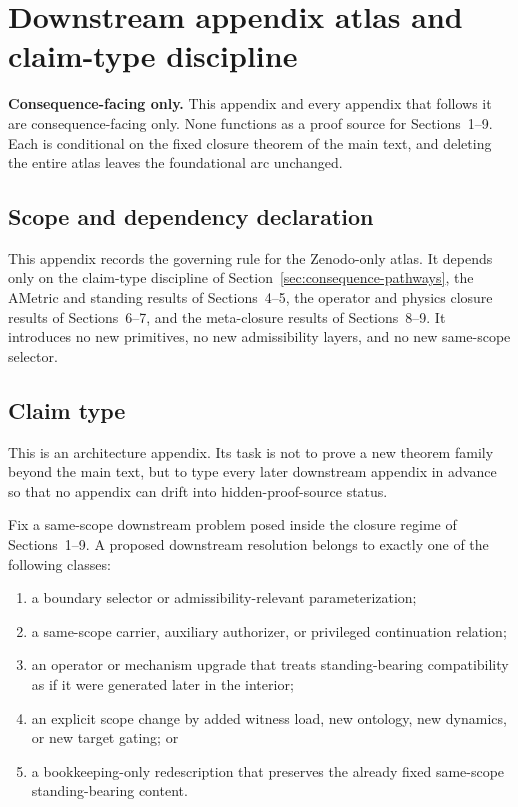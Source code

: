 \section{Downstream appendix atlas and claim-type discipline}
\label{app:downstream-atlas-overview}

\begin{fixedbox}
\textbf{Consequence-facing only.} This appendix and every appendix that follows it are consequence-facing only. None functions as a proof source for Sections~1--9. Each is conditional on the fixed closure theorem of the main text, and deleting the entire atlas leaves the foundational arc unchanged.
\end{fixedbox}

\subsection*{Scope and dependency declaration}
This appendix records the governing rule for the Zenodo-only atlas. It depends only on the claim-type discipline of Section~\ref{sec:consequence-pathways}, the AMetric and standing results of Sections~4--5, the operator and physics closure results of Sections~6--7, and the meta-closure results of Sections~8--9. It introduces no new primitives, no new admissibility layers, and no new same-scope selector.

\subsection*{Claim type}
This is an architecture appendix. Its task is not to prove a new theorem family beyond the main text, but to type every later downstream appendix in advance so that no appendix can drift into hidden-proof-source status.

\begin{definition}
\label{def:downstream-exhaustion-schema}
Fix a same-scope downstream problem posed inside the closure regime of Sections~1--9. A proposed downstream resolution belongs to exactly one of the following classes:
\begin{enumerate}
  \item a boundary selector or admissibility-relevant parameterization;
  \item a same-scope carrier, auxiliary authorizer, or privileged continuation relation;
  \item an operator or mechanism upgrade that treats standing-bearing compatibility as if it were generated later in the interior;
  \item an explicit scope change by added witness load, new ontology, new dynamics, or new target gating; or
  \item a bookkeeping-only redescription that preserves the already fixed same-scope standing-bearing content.
\end{enumerate}
\end{definition}

